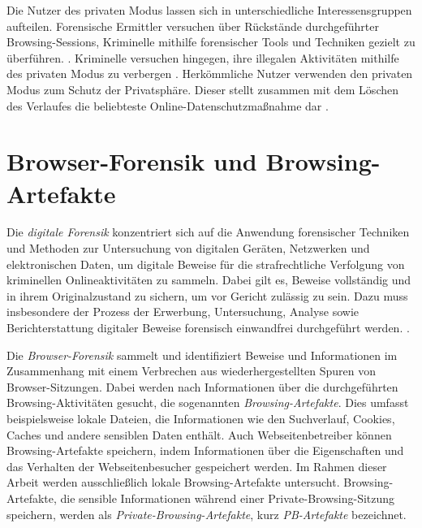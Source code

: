 Die Nutzer des privaten Modus lassen sich in unterschiedliche Interessensgruppen aufteilen. 
Forensische Ermittler versuchen über Rückstände durchgeführter Browsing-Sessions, Kriminelle mithilfe forensischer Tools und Techniken gezielt zu überführen. \cite{Montasari.2015}. Kriminelle versuchen hingegen, ihre illegalen Aktivitäten mithilfe des privaten Modus zu verbergen \cite{Mahlous.2020}. 
Herkömmliche Nutzer verwenden den privaten Modus zum Schutz der Privatsphäre. Dieser stellt zusammen mit dem Löschen des Verlaufes die beliebteste Online-Datenschutzmaßnahme dar \cite{Horsman.2019}. 

\section{Browser-Forensik und Browsing-Artefakte}\label{chap:theorie-browser-forensics-artefakte} %

Die \textit{digitale Forensik} konzentriert sich auf die Anwendung forensischer Techniken und Methoden zur Untersuchung von digitalen Geräten, Netzwerken und elektronischen Daten, um digitale Beweise für die strafrechtliche Verfolgung von kriminellen Onlineaktivitäten zu sammeln.
Dabei gilt es, Beweise vollständig und in ihrem Originalzustand zu sichern, um vor Gericht zulässig zu sein. Dazu muss insbesondere der Prozess der Erwerbung, Untersuchung, Analyse sowie Berichterstattung digitaler Beweise forensisch einwandfrei durchgeführt werden.  \cite{Izzati.2022}.

Die \textit{Browser-Forensik} sammelt und identifiziert Beweise und Informationen im Zusammenhang mit einem Verbrechen aus wiederhergestellten Spuren von Browser-Sitzungen. 
Dabei werden nach Informationen über die durchgeführten Browsing-Aktivitäten gesucht, die sogenannten \textit{Browsing-Artefakte}. 
Dies umfasst beispielsweise lokale Dateien, die Informationen wie den Suchverlauf, Cookies, Caches und andere sensiblen Daten enthält. Auch Webseitenbetreiber können Browsing-Artefakte speichern, indem Informationen über die Eigenschaften und das Verhalten der Webseitenbesucher gespeichert werden. Im Rahmen dieser Arbeit werden ausschließlich lokale Browsing-Artefakte untersucht.  \cite{Izzati.2022}
Browsing-Artefakte, die sensible Informationen während einer Private-Browsing-Sitzung speichern, werden als \textit{Private-Browsing-Artefakte}, kurz \textit{PB-Artefakte} bezeichnet.

